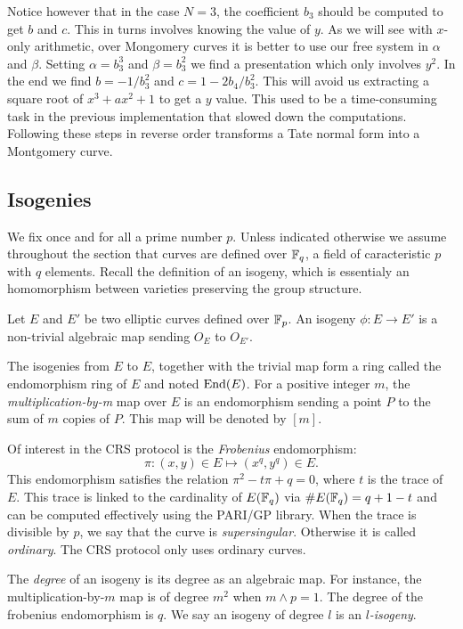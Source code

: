 \documentclass[../main/main.tex]{subfiles}
\begin{document}
Notice however that in the case $N=3$, the coefficient $b_3$ should be computed to get $b$ and $c$.
This in turns involves knowing the value of $y$.
As we will see with $x$-only arithmetic, over Mongomery curves it is better to use our free system in $\alpha$ and $\beta$.
Setting $\alpha = b_3^3$ and $\beta = b_3^2$ we find a presentation which only involves $y^2$.
In the end we find $b = -1/b_3^2$ and $c = 1 - 2b_4 / b_3^2$.
This will avoid us extracting a square root of $x^3 + ax^2 + 1$ to get a $y$ value.
This used to be a time-consuming task in the previous implementation that slowed down the computations.
Following these steps in reverse order transforms a Tate normal form into a Montgomery curve.

\subsection{Isogenies}
We fix once and for all a prime number $p$.
Unless indicated otherwise we assume throughout the section that curves are defined over $\mathbb{F}_q$, a field of caracteristic $p$ with $q$ elements.
Recall the definition of an isogeny, which is essentialy an homomorphism between varieties preserving the group structure.
\begin{definition}
	Let $E$ and $E'$ be two elliptic curves defined over $\mathbb{F}_p$.
	An isogeny $\phi:E\rightarrow E'$ is a non-trivial algebraic map sending $O_E$ to $O_{E'}$.
\end{definition}
The isogenies from $E$ to $E$, together with the trivial map form a ring called the endomorphism ring of $E$ and noted $\text{End} (E)$.
For a positive integer $m$, the \textit{multiplication-by-m} map over $E$ is an endomorphism sending a point $P$ to the sum of $m$ copies of $P$.
This map will be denoted by $[m]$.
\begin{example}
Of interest in the CRS protocol is the \textit{Frobenius} endomorphism:
	\[
		\pi: (x, y)\in E\mapsto (x^q, y^q)\in E.
	\]
This endomorphism satisfies the relation $\pi ^2 -t\pi + q = 0$, where $t$ is the trace of $E$.
This trace is linked to the cardinality of $E(\mathbb{F}_q)$ via $\# E(\mathbb{F}_q) = q+1 -t$ and can be computed effectively using the PARI/GP library.
When the trace is divisible by $p$, we say that the curve is \textit{supersingular}.
Otherwise it is called \textit{ordinary}.
The CRS protocol only uses ordinary curves.
\end{example}
The \textit{degree} of an isogeny is its degree as an algebraic map.
For instance, the multiplication-by-$m$ map is of degree $m^2$ when $m\wedge p = 1$.
The degree of the frobenius endomorphism is $q$.
We say an isogeny of degree $l$ is an $l$\textit{-isogeny}.
\end{document}
